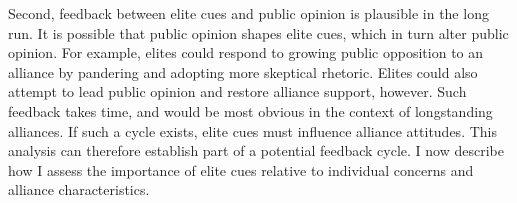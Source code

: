 \documentclass[12pt]{article}
\begin{document}
%
%
%
%
%



Second, feedback between elite cues and public opinion is plausible in the long run. 
It is possible that public opinion shapes elite cues, which in turn alter public opinion. 
For example, elites could respond to growing public opposition to an alliance by pandering and adopting more skeptical rhetoric. 
Elites could also attempt to lead public opinion and restore alliance support, however.
Such feedback takes time, and would be most obvious in the context of longstanding alliances.
If such a cycle exists, elite cues must influence alliance attitudes.
This analysis can therefore establish part of a potential feedback cycle. 
I now describe how I assess the importance of elite cues relative to individual concerns and alliance characteristics. 
\end{document}
